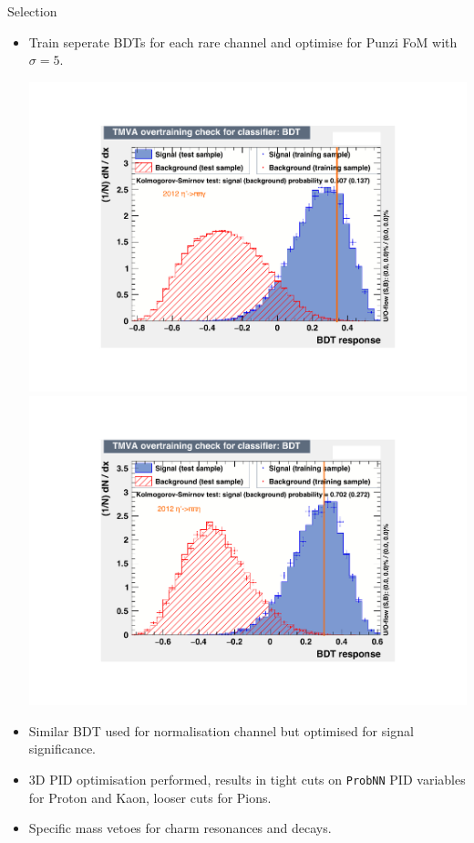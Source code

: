 \documentclass{beamer}
\def\EtapPiPiG   {\decay{\etapr}{\pip\pim\gamma}\xspace}
\def\EtapPiPiEta {\decay{\etapr}{\pip\pim\Peta}\xspace}
\begin{document}
\begin{frame}{Selection}
  \small
  \begin{itemize}
  \item Train seperate BDTs for each rare channel and optimise for Punzi FoM with $\sigma=5$.
    \begin{center}
      \includegraphics[width=.45\textwidth]{2012IOPpipig.pdf}
      \includegraphics[width=.45\textwidth]{pipieta12IOP.pdf}
    \end{center}
  \item Similar BDT used for normalisation channel but optimised for signal significance.
  \item 3D PID optimisation performed, results in tight cuts on \texttt{ProbNN} PID variables for Proton and Kaon, looser cuts for Pions.
  \item Specific mass vetoes for charm resonances and \decay{\Lb}{\proton \Km \pip \pim} decays.

  \end{itemize}
\end{frame}
\end{document}
